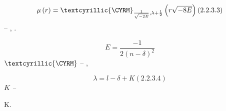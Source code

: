 \documentclass[a4paper]{article}
\begin{document}
\begin{equation*}
\mu \left(r\right)=\text{\textcyrillic{{\CYRM}}}_{\frac 1{\sqrt{-2E}},\lambda +\frac 1
2}\left(r\sqrt{-8E}\right)(2.2.3.3)
\end{equation*}
{\CYREREV}{\cyrn}{\cyre}{\cyrr}{\cyrg}{\cyri}{\cyrya} {\cyrv} {\cyrerev}{\cyrt}{\cyro}{\cyrm}
{\cyrv}{\cyrery}{\cyrr}{\cyra}{\cyrzh}{\cyre}{\cyrn}{\cyri}{\cyri} --
{\cyrv}{\cyre}{\cyrl}{\cyri}{\cyrch}{\cyri}{\cyrn}{\cyra},
{\cyro}{\cyrp}{\cyrr}{\cyre}{\cyrd}{\cyre}{\cyrl}{\cyrya}{\cyre}{\cyrm}{\cyra}{\cyrya}
{\cyrerev}{\cyrk}{\cyrs}{\cyrp}{\cyre}{\cyrr}{\cyri}{\cyrm}{\cyre}{\cyrn}{\cyrt}{\cyra}{\cyrl}{\cyrsftsn}{\cyrn}{\cyro}.

{\CYRM}{\cyro}{\cyrzh}{\cyrn}{\cyro}
{\cyrv}{\cyro}{\cyrs}{\cyrp}{\cyro}{\cyrl}{\cyrsftsn}{\cyrz}{\cyro}{\cyrv}{\cyra}{\cyrt}{\cyrsftsn}{\cyrs}{\cyrya}
{\cyri}{\cyrz}{\cyrv}{\cyre}{\cyrs}{\cyrt}{\cyrn}{\cyro}{\cyrishrt}
{\cyrf}{\cyro}{\cyrr}{\cyrm}{\cyru}{\cyrl}{\cyro}{\cyrishrt} 

\begin{equation*}
E=\frac{-1}{2(n-\delta )^2}
\end{equation*}
{\CYRT}{\cyro}{\cyrg}{\cyrd}{\cyra} {\cyrch}{\cyrt}{\cyro}{\cyrb}{\cyrery}
{\cyro}{\cyrb}{\cyre}{\cyrs}{\cyrp}{\cyre}{\cyrch}{\cyri}{\cyrt}{\cyrsftsn}
{\cyrs}{\cyrh}{\cyro}{\cyrd}{\cyri}{\cyrm}{\cyro}{\cyrs}{\cyrt}{\cyrsftsn}  $\text{\textcyrillic{{\CYRM}}}$ --
{\cyrf}{\cyru}{\cyrn}{\cyrk}{\cyrc}{\cyri}{\cyri} {\CYRU}{\cyri}{\cyrt}{\cyre}{\cyrk}{\cyrk}{\cyre}{\cyrr}{\cyra}
{\cyrn}{\cyra} {\cyrb}{\cyre}{\cyrs}{\cyrk}{\cyro}{\cyrn}{\cyre}{\cyrch}{\cyrn}{\cyro}{\cyrs}{\cyrt}{\cyri}, 

\begin{equation*}
\lambda =l-\delta +K(2.2.3.4)
\end{equation*}
 $K$\textit{ -- }{\cyrc}{\cyre}{\cyrl}{\cyro}{\cyre} {\cyrch}{\cyri}{\cyrs}{\cyrl}{\cyro}

{\CYRO}{\cyrb}{\cyrs}{\cyru}{\cyrd}{\cyri}{\cyrm} {\cyrb}{\cyro}{\cyrl}{\cyre}{\cyre}
{\cyrp}{\cyro}{\cyrd}{\cyrr}{\cyro}{\cyrb}{\cyrn}{\cyro} {\cyrp}{\cyrr}{\cyro}{\cyrb}{\cyrl}{\cyre}{\cyrm}{\cyru}
{\cyrv}{\cyrery}{\cyrb}{\cyro}{\cyrr}{\cyra} \foreignlanguage{english}{K}.
\end{document}
